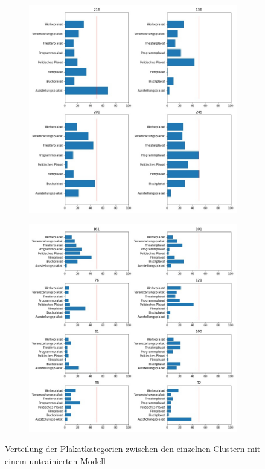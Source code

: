 \documentclass[a4paper,12pt,ngerman]{article}
\begin{document}
\newpage
\begin{landscape}
\begin{figure}[ht]
	\begin{subfigure}[b]{0.5\linewidth}
	\centering
	\includegraphics[height=\linewidth]{4_clusters_untrained}
	\end{subfigure}
	\begin{subfigure}[b]{0.5\linewidth}
	\centering
	\includegraphics[height=\linewidth]{8_clusters_untrained}
	\end{subfigure}
	\caption{Verteilung der Plakatkategorien zwischen den einzelnen Clustern mit einem untrainierten Modell}
\end{figure}
\end{landscape}
\end{document}
